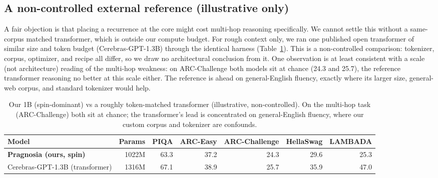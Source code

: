 \documentclass[journal]{IEEEtran}
\begin{document}
\subsection{A non-controlled external reference (illustrative only)}
A fair objection is that placing a recurrence at the core might cost multi-hop reasoning specifically. We cannot settle this without a same-corpus matched transformer, which is outside our compute budget. For rough context only, we ran one published open transformer of similar size and token budget (Cerebras-GPT-1.3B) through the identical harness (Table~\ref{tab:cerebras}). This is a non-controlled comparison: tokenizer, corpus, optimizer, and recipe all differ, so we draw no architectural conclusion from it. One observation is at least consistent with a scale (not architecture) reading of the multi-hop weakness: on ARC-Challenge both models sit at chance (24.3 and 25.7), the reference transformer reasoning no better at this scale either. The reference is ahead on general-English fluency, exactly where its larger size, general-web corpus, and standard tokenizer would help.

\begin{table}[t]\centering\small
\caption{Our 1B (spin-dominant) vs a roughly token-matched transformer (illustrative, non-controlled). On the multi-hop task (ARC-Challenge) both sit at chance; the transformer's lead is concentrated on general-English fluency, where our custom corpus and tokenizer are confounds.}
\label{tab:cerebras}
\begin{tabular}{@{}l r r r r r r@{}}
\toprule
Model & Params & PIQA & ARC-Easy & ARC-Challenge & HellaSwag & LAMBADA \\
\midrule
\textbf{Pragnosia (ours, spin)} & 1022M & 63.3 & 37.2 & 24.3 & 29.6 & 25.3 \\
Cerebras-GPT-1.3B (transformer) & 1316M & 67.1 & 38.9 & 25.7 & 35.9 & 47.0 \\
\bottomrule
\end{tabular}
\end{table}
\end{document}

